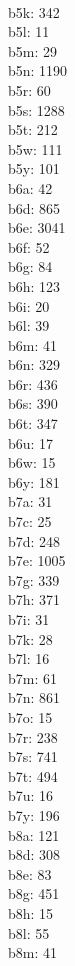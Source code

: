 \begin{multicols}{8}
  \\ b5k: 342
  \\ b5l: 11
  \\ b5m: 29
  \\ b5n: 1190
  \\ b5r: 60
  \\ b5s: 1288
  \\ b5t: 212
  \\ b5w: 111
  \\ b5y: 101
  \\ b6a: 42
  \\ b6d: 865
  \\ b6e: 3041
  \\ b6f: 52
  \\ b6g: 84
  \\ b6h: 123
  \\ b6i: 20
  \\ b6l: 39
  \\ b6m: 41
  \\ b6n: 329
  \\ b6r: 436
  \\ b6s: 390
  \\ b6t: 347
  \\ b6u: 17
  \\ b6w: 15
  \\ b6y: 181
  \\ b7a: 31
  \\ b7c: 25
  \\ b7d: 248
  \\ b7e: 1005
  \\ b7g: 339
  \\ b7h: 371
  \\ b7i: 31
  \\ b7k: 28
  \\ b7l: 16
  \\ b7m: 61
  \\ b7n: 861
  \\ b7o: 15
  \\ b7r: 238
  \\ b7s: 741
  \\ b7t: 494
  \\ b7u: 16
  \\ b7y: 196
  \\ b8a: 121
  \\ b8d: 308
  \\ b8e: 83
  \\ b8g: 451
  \\ b8h: 15
  \\ b8l: 55
  \\ b8m: 41

\end{multicols}
